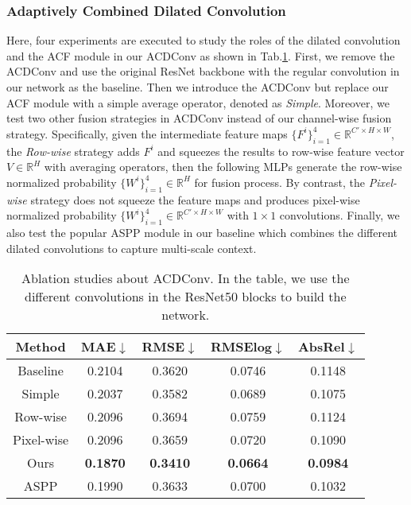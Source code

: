 \documentclass[letterpaper]{article} \usepackage{aaai21}  \usepackage{times}  \usepackage{helvet} \usepackage{courier}  \usepackage[hyphens]{url}  \usepackage{graphicx} \urlstyle{rm} \def\UrlFont{\rm}  \usepackage{natbib}  \usepackage{caption} \frenchspacing  \setlength{\pdfpagewidth}{8.5in}  \setlength{\pdfpageheight}{11in}
\newcommand{\newchange}[1]{{\color{black}#1}}
\begin{document}
\subsubsection{Adaptively Combined Dilated Convolution}
Here, four experiments are executed to study the roles of the dilated convolution and the ACF module in our ACDConv as shown in Tab.\ref{tab:abs-1}. 
First, we remove the ACDConv and use the original ResNet backbone with the regular convolution in our network as the baseline. Then we introduce the ACDConv but replace our ACF module with a simple average operator, denoted as \textit{Simple}.
\newchange{
Moreover, we test two other fusion strategies in ACDConv instead of our channel-wise fusion strategy. Specifically, given the intermediate feature maps $\{F^i\}_{i=1}^4\in \mathbb{R}^{C'\times H\times W}$, the \textit{Row-wise} strategy adds $F^i$ and squeezes the results to row-wise feature vector $V\in \mathbb{R}^{H}$ with averaging operators, then the following MLPs generate the row-wise normalized probability $\{W^i\}_{i=1}^4 \in \mathbb{R}^{H}$ for fusion process. By contrast, the \textit{Pixel-wise} strategy does not squeeze the feature maps and produces pixel-wise normalized probability $\{W^i\}_{i=1}^4 \in \mathbb{R}^{C'\times H\times W}$ with $1\times1$ convolutions.
}
Finally, we also test the popular ASPP module in our baseline which combines the different dilated convolutions to capture multi-scale context. 

\begin{table}[tb]
    \centering
\begin{tabular}{ccccc} 
\toprule 
Method & MAE$\downarrow$ & RMSE$\downarrow$ & RMSElog$\downarrow$ &  AbsRel$\downarrow$ \\
\midrule 
Baseline  & 0.2104 & 0.3620 & 0.0746 & 0.1148 \\
Simple & 0.2037 & 0.3582 & 0.0689 & 0.1075 \\
Row-wise & 0.2096 & 0.3694 & 0.0759 & 0.1124 \\
Pixel-wise & 0.2096 & 0.3659 & 0.0720 & 0.1090 \\
Ours   & \textbf{0.1870} & \textbf{0.3410} & \textbf{0.0664} & \textbf{0.0984} \\
ASPP & 0.1990 & 0.3633 & 0.0700 & 0.1032 \\
\bottomrule
    \end{tabular}
    \caption{Ablation studies about ACDConv. In the table, we use the different convolutions in the ResNet50 blocks to build the network.}
    \label{tab:abs-1}
\end{table}
\end{document}
